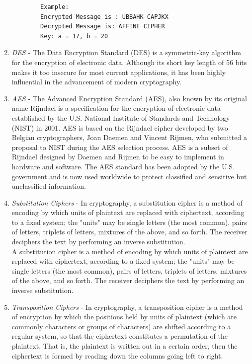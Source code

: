\documentclass[openany]{book}
\begin{document}
\begin{enumerate}
	      \begin{verbatim}
		Example:
		Encrypted Message is : UBBAHK CAPJKX
		Decrypted Message is: AFFINE CIPHER
		Key: a = 17, b = 20
	\end{verbatim}

	\item \textit{DES} - The Data Encryption Standard (DES) is a symmetric-key algorithm for the encryption of electronic data. Although its short key length of 56 bits makes it too insecure for most current applications, it has been highly influential in the advancement of modern cryptography.
	\item \textit{AES} - The Advanced Encryption Standard (AES), also known by its original name Rijndael is a specification for the encryption of electronic data established by the U.S. National Institute of Standards and Technology (NIST) in 2001. AES is based on the Rijndael cipher developed by two Belgian cryptographers, Joan Daemen and Vincent Rijmen, who submitted a proposal to NIST during the AES selection process. AES is a subset of Rijndael designed by Daemen and Rijmen to be easy to implement in hardware and software. The AES standard has been adopted by the U.S. government and is now used worldwide to protect classified and sensitive but unclassified information.
	\item \textit{Substitution Ciphers} - In cryptography, a substitution cipher is a method of encoding by which units of plaintext are replaced with ciphertext, according to a fixed system; the "units" may be single letters (the most common), pairs of letters, triplets of letters, mixtures of the above, and so forth. The receiver deciphers the text by performing an inverse substitution.\\

	      A substitution cipher is a method of encoding by which units of plaintext are replaced with ciphertext, according to a fixed system; the "units" may be single letters (the most common), pairs of letters, triplets of letters, mixtures of the above, and so forth. The receiver deciphers the text by performing an inverse substitution.

	\item \textit{Transposition Ciphers} - In cryptography, a transposition cipher is a method of encryption by which the positions held by units of plaintext (which are commonly characters or groups of characters) are shifted according to a regular system, so that the ciphertext constitutes a permutation of the plaintext. That is, the plaintext is written out in a certain order, then the ciphertext is formed by reading down the columns going left to right.\\

\end{enumerate}
\end{document}
